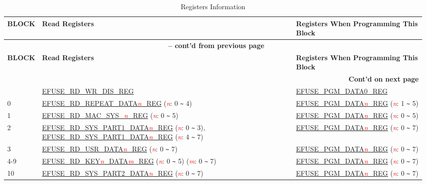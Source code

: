 \begin{longtable}[c]{|l|l|l|}
\caption{Registers Information}
\label{tab:efuse-softw-read-para}
\\\hline
    \rowcolor{lightgray}
        \textbf{BLOCK} & \textbf{Read Registers} & \textbf{Registers When Programming This Block}\\
    \endfirsthead
    
    \multicolumn{3}{c}{\bfseries \tablename\ \thetable{} -- cont'd from previous page}\\\hline
    
    \rowcolor{lightgray}
        \textbf{BLOCK} & \textbf{Read Registers} & \textbf{Registers When Programming This Block}\\
    \endhead
    
    \multicolumn{3}{r}{\textbf{Cont'd on next page}} \\
    \endfoot
    \endlastfoot
    \hline
    0 & \hyperref[regdesc:EFUSERDWRDISREG]{EFUSE\_RD\_WR\_DIS\_REG} & \hyperref[regdesc:EFUSEPGMDATANREG]{\hyperref[regdesc:EFUSEPGMDATANREG]{EFUSE\_PGM\_DATA0\_REG}} \\\hline
    0 & \hyperref[regdesc:EFUSERDREPEATDATA0REG]{EFUSE\_RD\_REPEAT\_DATA\textcolor{red}{\it{n}}\_REG} (\textcolor{red}{\it{n}}: 0 \verb+~+ 4) & \hyperref[regdesc:EFUSEPGMDATANREG]{EFUSE\_PGM\_DATA\textcolor{red}{\it{n}}\_REG} (\textcolor{red}{\it{n}}: 1 \verb+~+ 5)  \\\hline
    1 & \hyperref[regdesc:EFUSERDMACSYS0REG]{EFUSE\_RD\_MAC\_SYS\_\textcolor{red}{\it{n}}\_REG} (\textcolor{red}{\it{n}}: 0 \verb+~+ 5)  & \hyperref[regdesc:EFUSEPGMDATANREG]{EFUSE\_PGM\_DATA\textcolor{red}{\it{n}}\_REG}  (\textcolor{red}{\it{n}}: 0 \verb+~+ 5) \\\hline
    2 & \hyperref[regdesc:EFUSERDSYSPART1DATA0REG]{EFUSE\_RD\_SYS\_PART1\_DATA\textcolor{red}{\it{n}}\_REG} (\textcolor{red}{\it{n}}: 0 \verb+~+ 3), \hyperref[regdesc:EFUSERDSYSPART1DATA4TO7REG]{EFUSE\_RD\_SYS\_PART1\_DATA\textcolor{red}{\it{n}}\_REG} (\textcolor{red}{\it{n}}: 4 \verb+~+ 7) & \hyperref[regdesc:EFUSEPGMDATANREG]{EFUSE\_PGM\_DATA\textcolor{red}{\it{n}}\_REG}  (\textcolor{red}{\it{n}}: 0 \verb+~+ 7) \\\hline
    3 & \hyperref[regdesc:EFUSERDUSRDATANREG]{EFUSE\_RD\_USR\_DATA\textcolor{red}{\it{n}}\_REG} (\textcolor{red}{\it{n}}: 0 \verb+~+ 7) & \hyperref[regdesc:EFUSEPGMDATANREG]{EFUSE\_PGM\_DATA\textcolor{red}{\it{n}}\_REG} (\textcolor{red}{\it{n}}: 0 \verb+~+ 7)  \\ \hline
    4-9 & \hyperref[regdesc:EFUSERDKEY0DATANREG]{EFUSE\_RD\_KEY\textcolor{red}{\it{n}}\_DATA\textcolor{red}{\it{m}}\_REG} (\textcolor{red}{\it{n}}: 0 \verb+~+ 5) (\textcolor{red}{\it{m}}: 0 \verb+~+ 7)  & \hyperref[regdesc:EFUSEPGMDATANREG]{EFUSE\_PGM\_DATA\textcolor{red}{\it{n}}\_REG} (\textcolor{red}{\it{n}}: 0 \verb+~+ 7)  \\\hline
    10 & \hyperref[regdesc:EFUSERDSYSPART2DATANREG]{EFUSE\_RD\_SYS\_PART2\_DATA\textcolor{red}{\it{n}}\_REG} (\textcolor{red}{\it{n}}: 0 \verb+~+ 7) & \hyperref[regdesc:EFUSEPGMDATANREG]{EFUSE\_PGM\_DATA\textcolor{red}{\it{n}}\_REG} (\textcolor{red}{\it{n}}: 0 \verb+~+ 7) \\\hline
\end{longtable}
